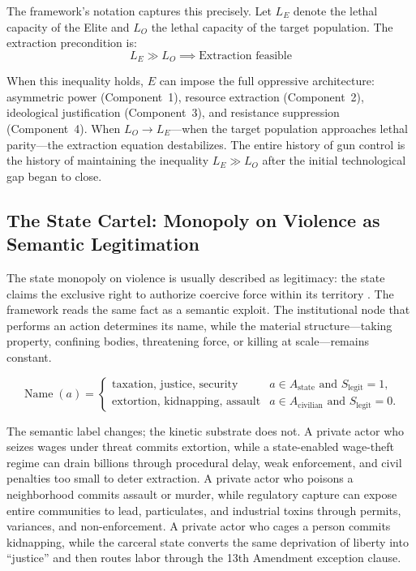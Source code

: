 The framework's notation captures this precisely. Let $L_E$ denote the lethal capacity of the Elite and $L_O$ the lethal capacity of the target population. The extraction precondition is:
\begin{equation}\label{eq:11.1-extraction-precondition}
L_E \gg L_O \implies \text{Extraction feasible}
\end{equation}

When this inequality holds, $E$ can impose the full oppressive architecture: asymmetric power (Component~1), resource extraction (Component~2), ideological justification (Component~3), and resistance suppression (Component~4). When $L_O \to L_E$---when the target population approaches lethal parity---the extraction equation destabilizes. The entire history of gun control is the history of maintaining the inequality $L_E \gg L_O$ after the initial technological gap began to close.

\subsection{The State Cartel: Monopoly on Violence as Semantic Legitimation}

The state monopoly on violence is usually described as legitimacy: the state claims the exclusive right to authorize coercive force within its territory \cite{weber_politics_vocation}. The framework reads the same fact as a semantic exploit. The institutional node that performs an action determines its name, while the material structure---taking property, confining bodies, threatening force, or killing at scale---remains constant.

\begin{equation}\label{eq:11.1a-state-semantic-legitimation}
\operatorname{Name}(a)=
\begin{cases}
\text{taxation, justice, security} & a \in A_{\text{state}} \text{ and } S_{\text{legit}}=1,\\
\text{extortion, kidnapping, assault} & a \in A_{\text{civilian}} \text{ and } S_{\text{legit}}=0.
\end{cases}
\end{equation}

The semantic label changes; the kinetic substrate does not. A private actor who seizes wages under threat commits extortion, while a state-enabled wage-theft regime can drain billions through procedural delay, weak enforcement, and civil penalties too small to deter extraction. A private actor who poisons a neighborhood commits assault or murder, while regulatory capture can expose entire communities to lead, particulates, and industrial toxins through permits, variances, and non-enforcement. A private actor who cages a person commits kidnapping, while the carceral state converts the same deprivation of liberty into ``justice'' and then routes labor through the 13th Amendment exception clause.

